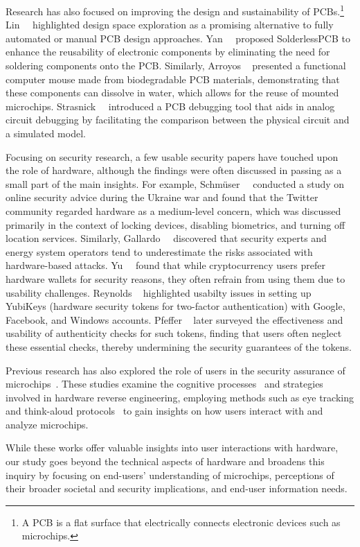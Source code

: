 Research has also focused on improving the design and sustainability of \acfp{PCB}.\footnote{A \ac{PCB} is a flat surface that electrically connects electronic devices such as microchips.} 
Lin~\etal~\cite{DBLP:conf/chi/LinRPTDHM24} highlighted design space exploration as a promising alternative to fully automated or manual \ac{PCB} design approaches.
Yan~\etal~\cite{DBLP:conf/chi/YanL0P24} proposed SolderlessPCB to enhance the reusability of electronic components by eliminating the need for soldering components onto the \ac{PCB}.
Similarly, Arroyos \etal~\cite{DBLP:conf/chi/ArroyosVKOSSIN22} presented a functional computer mouse made from biodegradable \ac{PCB} materials, demonstrating that these components can dissolve in water, which allows for the reuse of mounted microchips.
Strasnick~\etal~\cite{DBLP:conf/chi/StrasnickAF21} introduced a \ac{PCB} debugging tool that aids in analog circuit debugging by facilitating the comparison between the physical circuit and a simulated model.

Focusing on security research, a few usable security papers have touched upon the role of hardware, although the findings were often discussed in passing as a small part of the main insights.
For example, Schmüser~\etal~\cite{DBLP:conf/chi/SchmuserRWSB0SW24} conducted a study on online security advice during the Ukraine war and found that the Twitter community regarded hardware as a medium-level concern, which was discussed primarily in the context of locking devices, disabling biometrics, and turning off location services.
Similarly, Gallardo~\etal~\cite{DBLP:conf/chi/GallardoEBBC24} discovered that security experts and energy system operators tend to underestimate the risks associated with hardware-based attacks.
Yu~\etal~\cite{DBLP:conf/chi/YuSDW24} found that while cryptocurrency users prefer hardware wallets for security reasons, they often refrain from using them due to usability challenges.
Reynolds \etal~\cite{DBLP:conf/sp/ReynoldsSRDRS18} highlighted usabilty issues in setting up YubiKeys (\ie hardware security tokens for two-factor authentication) with Google, Facebook, and Windows accounts.
Pfeffer \etal~\cite{DBLP:conf/uss/PfefferMDGSWFK21} later surveyed the effectiveness and usability of authenticity checks for such tokens, finding that users often neglect these essential checks, thereby undermining the security guarantees of the tokens.

Previous research has also explored the role of users in the security assurance of microchips~\cite{DBLP:conf/soups/0001WARP20,DBLP:journals/tochi/WiesenBWPR23,DBLP:conf/chi/WalendyWL0WE0FR24}. 
These studies examine the cognitive processes~\cite{DBLP:conf/soups/0001WARP20} and strategies~\cite{DBLP:journals/tochi/WiesenBWPR23} involved in hardware reverse engineering, employing methods such as eye tracking and think-aloud protocols~\cite{DBLP:conf/chi/WalendyWL0WE0FR24} to gain insights on how users interact with and analyze microchips.

While these works offer valuable insights into user interactions with hardware, our study goes beyond the technical aspects of hardware and broadens this inquiry by focusing on end-users' understanding of microchips, perceptions of their broader societal and security implications, and end-user information needs.